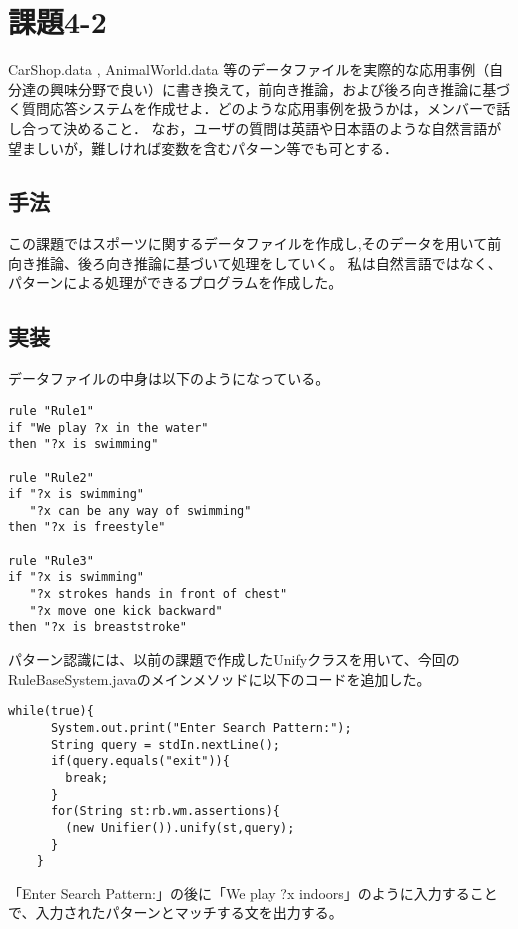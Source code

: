 \documentclass[a4j]{jarticle}
\begin{document}
\section{課題4-2}
\begin{screen}
CarShop.data , AnimalWorld.data 等のデータファイルを実際的な応用事例（自分達の興味分野で良い）に書き換えて，前向き推論，および後ろ向き推論に基づく質問応答システムを作成せよ．どのような応用事例を扱うかは，メンバーで話し合って決めること．
なお，ユーザの質問は英語や日本語のような自然言語が望ましいが，難しければ変数を含むパターン等でも可とする．
\end{screen}

\subsection{手法}
この課題ではスポーツに関するデータファイルを作成し,そのデータを用いて前向き推論、後ろ向き推論に基づいて処理をしていく。
私は自然言語ではなく、パターンによる処理ができるプログラムを作成した。

\subsection{実装}
データファイルの中身は以下のようになっている。
\begin{screen}
\begin{verbatim}
rule "Rule1"
if "We play ?x in the water"
then "?x is swimming"

rule "Rule2"
if "?x is swimming"
   "?x can be any way of swimming"
then "?x is freestyle"

rule "Rule3"
if "?x is swimming"
   "?x strokes hands in front of chest"
   "?x move one kick backward"
then "?x is breaststroke"
\end{verbatim}
\end{screen}
パターン認識には、以前の課題で作成したUnifyクラスを用いて、今回のRuleBaseSystem.javaのメインメソッドに以下のコードを追加した。
\begin{lstlisting}[caption=追加したコード]
    while(true){
      System.out.print("Enter Search Pattern:");
      String query = stdIn.nextLine();
      if(query.equals("exit")){
        break;
      }
      for(String st:rb.wm.assertions){
        (new Unifier()).unify(st,query);
      }
    }
\end{lstlisting}
「Enter Search Pattern:」の後に「We play ?x indoors」のように入力することで、入力されたパターンとマッチする文を出力する。
\end{document}
